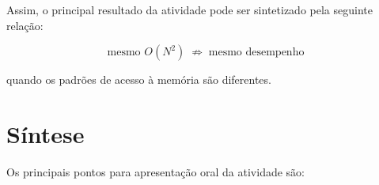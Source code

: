 Assim, o principal resultado da atividade pode ser sintetizado pela
seguinte relação:

\begin{equation}
\boxed{
\text{mesmo } O(N^2)
\;\not\Rightarrow\;
\text{mesmo desempenho}
}
\end{equation}

quando os padrões de acesso à memória são diferentes.



\section{Síntese}

\label{sec:atvd01-defesa}

Os principais pontos para apresentação oral da atividade são:

